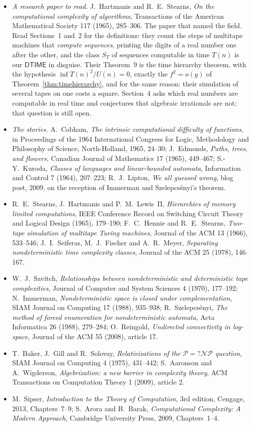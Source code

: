 \begin{itemize}
\item \emph{A research paper to read.} J.~Hartmanis and R.~E.~Stearns, \emph{On the computational complexity of algorithms}, Transactions of the American Mathematical Society 117 (1965), 285--306. The paper that named the field. Read Sections~1 and~2 for the definitions: they count the steps of multitape machines that \emph{compute sequences}, printing the digits of a real number one after the other, and the class $S_T$ of sequences computable in time $T(n)$ is our $\mathsf{DTIME}$ in disguise. Their Theorem~9 is the time hierarchy theorem, with the hypothesis $\inf T(n)^2/U(n)=0$, exactly the $f^2=o(g)$ of Theorem~\ref{thm:timehierarchy}, and for the same reason: their simulation of several tapes on one costs a square. Section~4 asks which real numbers are computable in real time and conjectures that algebraic irrationals are not; that question is still open.
\item \emph{The stories.} A.~Cobham, \emph{The intrinsic computational difficulty of functions}, in Proceedings of the 1964 International Congress for Logic, Methodology and Philosophy of Science, North-Holland, 1965, 24--30; J.~Edmonds, \emph{Paths, trees, and flowers}, Canadian Journal of Mathematics 17 (1965), 449--467; S.-Y.~Kuroda, \emph{Classes of languages and linear-bounded automata}, Information and Control 7 (1964), 207--223; R.~J.~Lipton, \emph{We all guessed wrong}, blog post, 2009, on the reception of Immerman and Szelepcsényi's theorem.
\item R.~E.~Stearns, J.~Hartmanis and P.~M.~Lewis~II, \emph{Hierarchies of memory limited computations}, IEEE Conference Record on Switching Circuit Theory and Logical Design (1965), 179--190; F.~C.~Hennie and R.~E.~Stearns, \emph{Two-tape simulation of multitape Turing machines}, Journal of the ACM 13 (1966), 533--546; J.~I.~Seiferas, M.~J.~Fischer and A.~R.~Meyer, \emph{Separating nondeterministic time complexity classes}, Journal of the ACM 25 (1978), 146--167.
\item W.~J.~Savitch, \emph{Relationships between nondeterministic and deterministic tape complexities}, Journal of Computer and System Sciences 4 (1970), 177--192; N.~Immerman, \emph{Nondeterministic space is closed under complementation}, SIAM Journal on Computing 17 (1988), 935--938; R.~Szelepcsényi, \emph{The method of forced enumeration for nondeterministic automata}, Acta Informatica 26 (1988), 279--284; O.~Reingold, \emph{Undirected connectivity in log-space}, Journal of the ACM 55 (2008), article 17.
\item T.~Baker, J.~Gill and R.~Solovay, \emph{Relativizations of the $\mathcal P=?\mathcal{NP}$ question}, SIAM Journal on Computing 4 (1975), 431--442; S.~Aaronson and A.~Wigderson, \emph{Algebrization: a new barrier in complexity theory}, ACM Transactions on Computation Theory 1 (2009), article 2.
\item M.~Sipser, \emph{Introduction to the Theory of Computation}, 3rd edition, Cengage, 2013, Chapters~7--9; S.~Arora and B.~Barak, \emph{Computational Complexity: A Modern Approach}, Cambridge University Press, 2009, Chapters~1--4.
\end{itemize}
